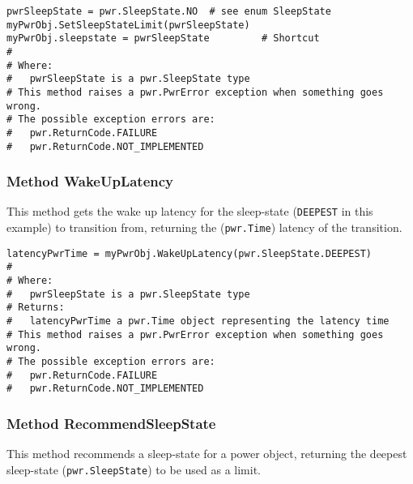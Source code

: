 \begin{center}\begin{minipage}{.95\linewidth}\begin{lstlisting}
pwrSleepState = pwr.SleepState.NO  # see enum SleepState
myPwrObj.SetSleepStateLimit(pwrSleepState)
myPwrObj.sleepstate = pwrSleepState         # Shortcut
#
# Where:
#   pwrSleepState is a pwr.SleepState type
# This method raises a pwr.PwrError exception when something goes wrong.
# The possible exception errors are: 
#   pwr.ReturnCode.FAILURE
#   pwr.ReturnCode.NOT_IMPLEMENTED
\end{lstlisting}\end{minipage}\end{center}

\subsubsection{Method WakeUpLatency} \label{meth:WakeUpLatency}

This method gets the wake up latency for the sleep-state (\texttt{DEEPEST} in this example) to
transition from, returning the (\texttt{pwr.Time}) latency of the transition.

\begin{center}\begin{minipage}{.95\linewidth}\begin{lstlisting}
latencyPwrTime = myPwrObj.WakeUpLatency(pwr.SleepState.DEEPEST)
#
# Where:
#   pwrSleepState is a pwr.SleepState type
# Returns:
#   latencyPwrTime a pwr.Time object representing the latency time
# This method raises a pwr.PwrError exception when something goes wrong.
# The possible exception errors are: 
#   pwr.ReturnCode.FAILURE
#   pwr.ReturnCode.NOT_IMPLEMENTED
\end{lstlisting}\end{minipage}\end{center}

\subsubsection{Method RecommendSleepState} \label{meth:RecommendSleepState}

This method recommends a sleep-state for a power object, returning the deepest sleep-state
(\texttt{pwr.SleepState}) to be used as a limit.

